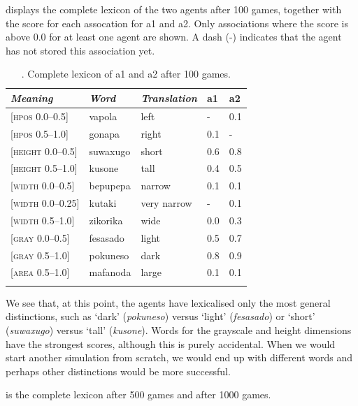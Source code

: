  displays the complete lexicon of the two agents after 100 games, 
together with the score for each assocation for 
{\bfshape  a1} and {\bfshape  a2}. Only associations where the 
score is above 0.0 for at least one agent are shown. 
A dash (-) indicates that the agent has not stored 
this association yet. 


\begin{table}
\begin{center}
\begin{tabular}{ l  l  l  l  l }
\lsptoprule
{\itshape Meaning}&{\itshape Word}&{\itshape Translation} & {\bfshape  a1}&{\bfshape  a2} \\ \midrule
{}[\textsc{hpos} 0.0–0.5] & vapola&left&-&0.1\\ 
{}[\textsc{hpos} 0.5–1.0]& gonapa&right &0.1&-\\ 
{}[\textsc{height} 0.0–0.5]&suwaxugo&short &0.6&0.8\\ 
{}[\textsc{height} 0.5–1.0]& kusone&tall &0.4&0.5\\ 
{}[\textsc{width} 0.0–0.5]&bepupepa&narrow &0.1&0.1\\ 
{}[\textsc{width} 0.0–0.25]&kutaki&very narrow &-&0.1\\ 
{}[\textsc{width} 0.5–1.0]& zikorika&wide &0.0&0.3\\ 
{}[\textsc{gray} 0.0–0.5]& fesasado&light &0.5&0.7\\ 
{}[\textsc{gray} 0.5–1.0]& pokuneso&dark &0.8&0.9\\ 
{}[\textsc{area} 0.5–1.0]& mafanoda&large &0.1&0.1\\ 
\lspbottomrule
\end{tabular}
\caption{\label{tab:lex100}. Complete lexicon of {\bfshape  a1} and {\bfshape  a2} after 100 games.}
\end{center}
\end{table}
We see that, at this point, the agents have lexicalised 
only the most general distinctions, such as `dark' (\emph{pokuneso}) 
versus `light' (\emph{fesasado}) or `short' (\emph{suwaxugo}) versus `tall' 
(\emph{kusone}). Words for the grayscale and height dimensions
have the strongest scores, although this is purely accidental. 
When we would start another simulation from scratch,
we would end up with different words and perhaps 
other distinctions would be more successful. 

 is the complete lexicon after 500 games and  after 1000 games. 


